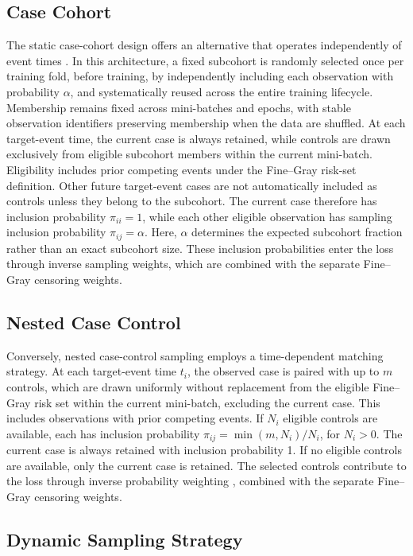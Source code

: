 \documentclass[a4paper,twoside,12pt]{report}
\begin{document}
\subsection{Case Cohort}
The static case-cohort design offers an alternative that operates independently of event times \citep{Prentice1986}. In this architecture, a fixed subcohort is randomly selected once per training fold, before training, by independently including each observation with probability $\alpha$, and systematically reused across the entire training lifecycle. Membership remains fixed across mini-batches and epochs, with stable observation identifiers preserving membership when the data are shuffled. At each target-event time, the current case is always retained, while controls are drawn exclusively from eligible subcohort members within the current mini-batch. Eligibility includes prior competing events under the Fine--Gray risk-set definition. Other future target-event cases are not automatically included as controls unless they belong to the subcohort. The current case therefore has inclusion probability $\pi_{ii}=1$, while each other eligible observation has sampling inclusion probability $\pi_{ij}=\alpha$. Here, $\alpha$ determines the expected subcohort fraction rather than an exact subcohort size. These inclusion probabilities enter the loss through inverse sampling weights, which are combined with the separate Fine--Gray censoring weights.


\subsection{Nested Case Control}
Conversely, nested case-control sampling employs a time-dependent matching strategy. At each target-event time $t_i$, the observed case is paired with up to $m$ controls, which are drawn uniformly without replacement from the eligible Fine--Gray risk set within the current mini-batch, excluding the current case. This includes observations with prior competing events. If $N_i$ eligible controls are available, each has inclusion probability $\pi_{ij}=\min(m,N_i)/N_i$, for $N_i>0$. The current case is always retained with inclusion probability 1. If no eligible controls are available, only the current case is retained. The selected controls contribute to the loss through inverse probability weighting \citep{HorvitzThompson1952}, combined with the separate Fine--Gray censoring weights.



\subsection{Dynamic Sampling Strategy}
\end{document}
